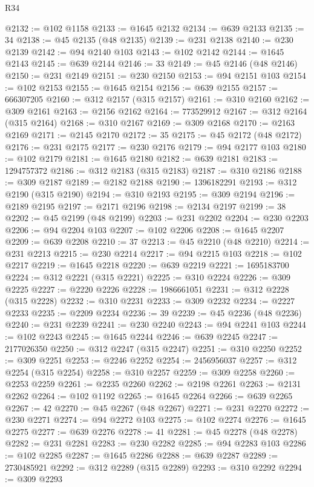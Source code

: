 \begin{lexlean}{R34}
\begin{coremodule}
@2132 := @102 @1158
@2133 := @1645 @2132
@2134 := @639 @2133
@2135 := 34
@2138 := @45 @2135 (@48 @2135)
@2139 := @231 @2138
@2140 := @230 @2139
@2142 := @94 @2140 @103
@2143 := @102 @2142
@2144 := @1645 @2143
@2145 := @639 @2144
@2146 := 33
@2149 := @45 @2146 (@48 @2146)
@2150 := @231 @2149
@2151 := @230 @2150
@2153 := @94 @2151 @103
@2154 := @102 @2153
@2155 := @1645 @2154
@2156 := @639 @2155
@2157 := 666307205
@2160 := @312 @2157 (@315 @2157)
@2161 := @310 @2160
@2162 := @309 @2161
@2163 := @2156 @2162
@2164 := 773529912
@2167 := @312 @2164 (@315 @2164)
@2168 := @310 @2167
@2169 := @309 @2168
@2170 := @2163 @2169
@2171 := @2145 @2170
@2172 := 35
@2175 := @45 @2172 (@48 @2172)
@2176 := @231 @2175
@2177 := @230 @2176
@2179 := @94 @2177 @103
@2180 := @102 @2179
@2181 := @1645 @2180
@2182 := @639 @2181
@2183 := 1294757372
@2186 := @312 @2183 (@315 @2183)
@2187 := @310 @2186
@2188 := @309 @2187
@2189 := @2182 @2188
@2190 := 1396182291
@2193 := @312 @2190 (@315 @2190)
@2194 := @310 @2193
@2195 := @309 @2194
@2196 := @2189 @2195
@2197 := @2171 @2196
@2198 := @2134 @2197
@2199 := 38
@2202 := @45 @2199 (@48 @2199)
@2203 := @231 @2202
@2204 := @230 @2203
@2206 := @94 @2204 @103
@2207 := @102 @2206
@2208 := @1645 @2207
@2209 := @639 @2208
@2210 := 37
@2213 := @45 @2210 (@48 @2210)
@2214 := @231 @2213
@2215 := @230 @2214
@2217 := @94 @2215 @103
@2218 := @102 @2217
@2219 := @1645 @2218
@2220 := @639 @2219
@2221 := 1695183700
@2224 := @312 @2221 (@315 @2221)
@2225 := @310 @2224
@2226 := @309 @2225
@2227 := @2220 @2226
@2228 := 1986661051
@2231 := @312 @2228 (@315 @2228)
@2232 := @310 @2231
@2233 := @309 @2232
@2234 := @2227 @2233
@2235 := @2209 @2234
@2236 := 39
@2239 := @45 @2236 (@48 @2236)
@2240 := @231 @2239
@2241 := @230 @2240
@2243 := @94 @2241 @103
@2244 := @102 @2243
@2245 := @1645 @2244
@2246 := @639 @2245
@2247 := 2177026350
@2250 := @312 @2247 (@315 @2247)
@2251 := @310 @2250
@2252 := @309 @2251
@2253 := @2246 @2252
@2254 := 2456956037
@2257 := @312 @2254 (@315 @2254)
@2258 := @310 @2257
@2259 := @309 @2258
@2260 := @2253 @2259
@2261 := @2235 @2260
@2262 := @2198 @2261
@2263 := @2131 @2262
@2264 := @102 @1192
@2265 := @1645 @2264
@2266 := @639 @2265
@2267 := 42
@2270 := @45 @2267 (@48 @2267)
@2271 := @231 @2270
@2272 := @230 @2271
@2274 := @94 @2272 @103
@2275 := @102 @2274
@2276 := @1645 @2275
@2277 := @639 @2276
@2278 := 41
@2281 := @45 @2278 (@48 @2278)
@2282 := @231 @2281
@2283 := @230 @2282
@2285 := @94 @2283 @103
@2286 := @102 @2285
@2287 := @1645 @2286
@2288 := @639 @2287
@2289 := 2730485921
@2292 := @312 @2289 (@315 @2289)
@2293 := @310 @2292
@2294 := @309 @2293

\end{coremodule}
\end{lexlean}

